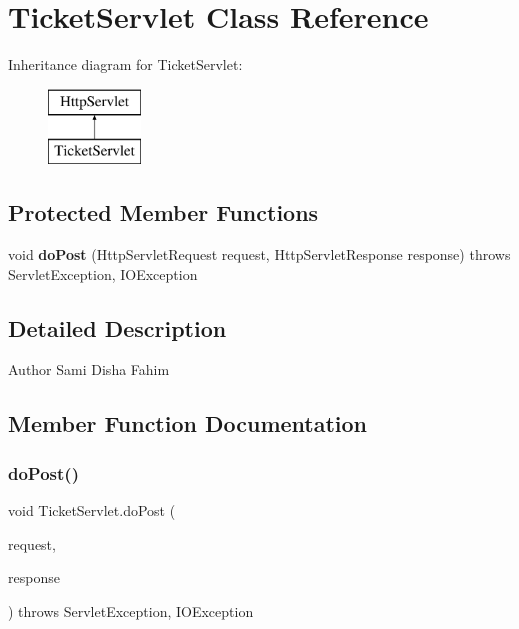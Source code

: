 \section{Ticket\+Servlet Class Reference}
\label{class_ticket_servlet}
Inheritance diagram for Ticket\+Servlet\+:\begin{figure}[H]
\begin{center}
\leavevmode
\includegraphics[height=2.000000cm]{class_ticket_servlet}
\end{center}
\end{figure}
\subsection*{Protected Member Functions}
\begin{DoxyCompactItemize}
\item 
void \textbf{ do\+Post} (Http\+Servlet\+Request request, Http\+Servlet\+Response response)  throws Servlet\+Exception, I\+O\+Exception 
\end{DoxyCompactItemize}


\subsection{Detailed Description}
\begin{DoxyAuthor}{Author}
Sami Disha Fahim 
\end{DoxyAuthor}


\subsection{Member Function Documentation}
\mbox{\label{class_ticket_servlet_a99c1aa0e520c8af440003876d0488ac4}} 
\subsubsection{doPost()}
{\footnotesize\ttfamily void Ticket\+Servlet.\+do\+Post (\begin{DoxyParamCaption}\item[{Http\+Servlet\+Request}]{request,  }\item[{Http\+Servlet\+Response}]{response }\end{DoxyParamCaption}) throws Servlet\+Exception, I\+O\+Exception\hspace{0.3cm}{\ttfamily [protected]}}

